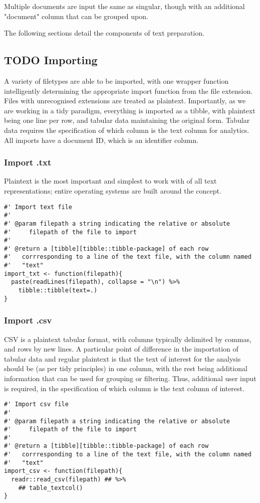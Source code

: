 \documentclass[a4paper, 11pt]{article}
\begin{document}
Multiple documents are input the same as singular, though with an
additional "document" column that can be grouped upon.

The following sections detail the components of text preparation.
\subsection{{\bfseries\sffamily TODO} Importing}
\label{sec:org1832923}
A variety of filetypes are able to be imported, with one wrapper
function intelligently determining the appropriate import function
from the file extension. Files with unrecognised extensions are
treated as plaintext. Importantly, as we are working in a tidy
paradigm, everything is imported as a tibble, with plaintext being one
line per row, and tabular data maintaining the original form. Tabular
data requires the specification of which column is the text column for
analytics. All imports have a document ID, which is an identifier column.
\subsubsection{Import .txt}
\label{sec:org5fc4a16}
Plaintext is the most important and simplest to work with of all text
representations; entire operating systems are built around the
concept. 
\begin{verbatim}
#' Import text file 
#'
#' @param filepath a string indicating the relative or absolute
#'     filepath of the file to import
#' 
#' @return a [tibble][tibble::tibble-package] of each row
#'   corrresponding to a line of the text file, with the column named
#'   "text"
import_txt <- function(filepath){
  paste(readLines(filepath), collapse = "\n") %>%
    tibble::tibble(text=.)
}
\end{verbatim}
\subsubsection{Import .csv}
\label{sec:org0b0a805}
CSV is a plaintext tabular format, with columns typically delimited by
commas, and rows by new lines. A particular point of difference in the
importation of tabular data and regular plaintext is that the text of
interest for the analysis should be (as per tidy principles) in one
column, with the rest being additional information that can be used
for grouping or filtering. Thus, additional user input is required, in
the specification of which column is the text column of interest.
\begin{verbatim}
#' Import csv file
#'
#' @param filepath a string indicating the relative or absolute
#'     filepath of the file to import
#'
#' @return a [tibble][tibble::tibble-package] of each row
#'   corrresponding to a line of the text file, with the column named
#'   "text"
import_csv <- function(filepath){
  readr::read_csv(filepath) ## %>%
    ## table_textcol()
}
\end{verbatim}
\end{document}
